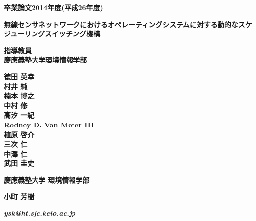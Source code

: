 \pagestyle{empty}

\begin{center}

\vspace{5cm}

\textbf{\Large 卒業論文2014年度(平成26年度)}

\vspace{1cm}

\textbf{\LARGE 無線センサネットワークにおけるオペレーティングシステムに対する動的なスケジューリングスイッチング機構}
\vspace{3cm}

\textbf{\underline{\large 指導教員}}\\
\textbf{慶應義塾大学環境情報学部}

\textbf{\Large 徳田 英幸}\\
\textbf{\Large 村井 純}\\
\textbf{\Large 楠本 博之}\\
\textbf{\Large 中村 修}\\
\textbf{\Large 高汐 一紀}\\
\textbf{\Large Rodney D. Van Meter III}\\
\textbf{\Large 植原 啓介}\\
\textbf{\Large 三次 仁}\\
\textbf{\Large 中澤 仁}\\
\textbf{\Large 武田 圭史}

\vspace{6cm}

\textbf{\LARGE 慶應義塾大学 環境情報学部}

\vspace{.5em}

\textbf{\LARGE 小町 芳樹}

\vspace{.3em}

\textbf{\it ysk@ht.sfc.keio.ac.jp}



\newpage

\end{center}

\pagestyle{plain}
